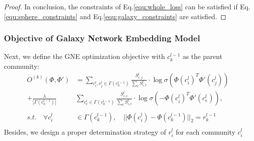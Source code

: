 \documentclass{article}
\theoremstyle{definition}
\begin{document}
\begin{proof}
	 In conclusion, the constraints of Eq.\ref{equ:whole_loss} can be satisfied if Eq.\ref{equ:sphere_constraints} and Eq.\ref{equ:galaxy_constraints} are satisfied.
	 \end{proof}

	 \subsubsection{Objective of Galaxy Network Embedding Model}
	 Next, we define the GNE optimization objective with $c_k^{l-1}$ as the parent community:
	 \begin{equation}
	  \label{equ:local_objective}
	  \begin{split}
	  O^{(k)}(\Phi, \Phi') & = \sum_{c_i^l, c_j^l \in \Gamma(c_k^{l-1})} \frac{S_{i,j}^l}{\sum_t S_{i, t}^l} \cdot \log{\sigma(\Phi(c_i^l)^T \Phi'(c_j^l))} \\
		 + \frac{\lambda}{|\Gamma(c_k^{l-1})|}&\sum_{c_e^l \in \Gamma(c_k^{l-1})} \frac{S_{i, e}^l}{\sum_t S_{i, t}^l} \cdot \log{\sigma(-\Phi(c_i^l)^T \Phi'(c_e^l))}, \\
		 \\
		s.t. \quad \forall c_i^{l} & \in \Gamma(c_k^{l-1}),\quad || \Phi(c_i^{l})  - \Phi(c_k^{l-1})||_2= r_k^{l-1} \\
	  \end{split}
	 \end{equation}
	 Besides, we design a proper determination strategy of $r_i^l$ for each community $c_i^l$
\end{document}
